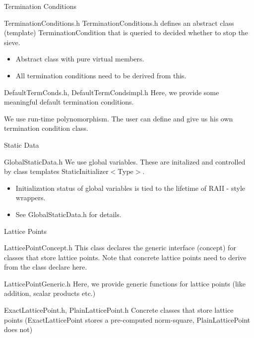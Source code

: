 \documentclass{beamer}
\begin{document}
\begin{frame}{Termination Conditions}
\begin{block}{TerminationConditions.h}
TerminationConditions.h defines an abstract class (template) TerminationCondition that is queried to decided whether to stop the sieve.
\begin{itemize}
 \item Abstract class with pure virtual members.
 \item All termination conditions need to be derived from this.
\end{itemize}
\end{block}
\begin{block}{DefaultTermConds.h, DefaultTermConds\textunderscore impl.h}
Here, we provide some meaningful default termination conditions.
\end{block}
We use run-time polynomorphism. The user can define and give us his own termination condition class.
\end{frame}

\begin{frame}{Static Data}
\begin{block}{GlobalStaticData.h}
We use global variables. These are initalized and controlled by class templates StaticInitializer$<$Type$>$.
\begin{itemize}
\item Initialization status of global variables is tied to the lifetime of RAII - style wrappers.
\item See GlobalStaticData.h for details.
\end{itemize}
\end{block}
\end{frame}

\begin{frame}{Lattice Points}
\begin{block}{LatticePointConcept.h}
This class declares the generic interface (concept) for classes that store lattice points.
Note that concrete lattice points need to derive from the class declare here.
\end{block}
\begin{block}{LatticePointGeneric.h}
Here, we provide generic functions for lattice points (like addition, scalar products etc.)
\end{block}
\begin{block}{ExactLatticePoint.h, PlainLatticePoint.h}
Concrete classes that store lattice points (ExactLatticePoint stores a pre-computed norm-square, PlainLatticePoint does not)
\end{block}
\end{frame}
\end{document}
